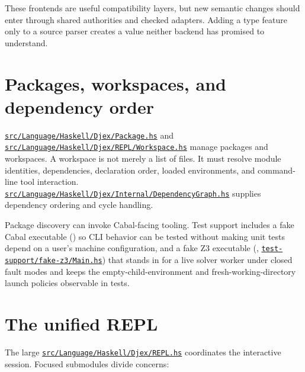 \documentclass[10pt,letterpaper,oneside]{report}
\newcommand{\code}[1]{\texttt{\detokenize{#1}}}
\def\DjexBase{https://github.com/VladimirReshetnikov/Djex/blob/d3d9662598460316bdcd177ce6768c521e764aa8/}
\newcommand{\dpath}[1]{\href{\DjexBase#1}{\nolinkurl{#1}}}
\begin{document}
These frontends are useful compatibility layers, but new semantic changes should enter through shared authorities and checked adapters. Adding a type feature only to a source parser creates a value neither backend has promised to understand.

\section{Packages, workspaces, and dependency order}

\dpath{src/Language/Haskell/Djex/Package.hs} and \dpath{src/Language/Haskell/Djex/REPL/Workspace.hs} manage packages and workspaces. A workspace is not merely a list of files. It must resolve module identities, dependencies, declaration order, loaded environments, and command-line tool interaction. \dpath{src/Language/Haskell/Djex/Internal/DependencyGraph.hs} supplies dependency ordering and cycle handling.

Package discovery can invoke Cabal-facing tooling. Test support includes a fake Cabal executable (\code{djex-fake-cabal}) so CLI behavior can be tested without making unit tests depend on a user's machine configuration, and a fake Z3 executable (\code{djex-fake-z3}, \dpath{test-support/fake-z3/Main.hs}) that stands in for a live solver worker under closed fault modes and keeps the empty-child-environment and fresh-working-directory launch policies observable in tests.

\section{The unified REPL}

The large \dpath{src/Language/Haskell/Djex/REPL.hs} coordinates the interactive session. Focused submodules divide concerns:
\end{document}
